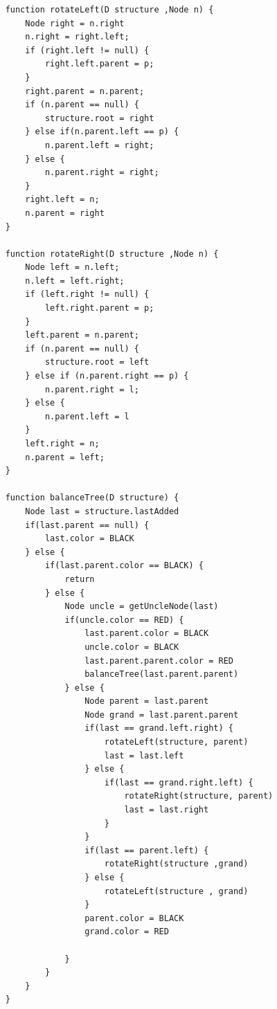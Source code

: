 \documentclass[11pt]{article}
\begin{document}
\begin{verbatim}
    function rotateLeft(D structure ,Node n) {
        Node right = n.right
        n.right = right.left;
        if (right.left != null) {
            right.left.parent = p;
        }
        right.parent = n.parent;
        if (n.parent == null) {
            structure.root = right
        } else if(n.parent.left == p) {
            n.parent.left = right;
        } else {
            n.parent.right = right;
        }
        right.left = n;
        n.parent = right  
    }

    function rotateRight(D structure ,Node n) {
        Node left = n.left;
        n.left = left.right;
        if (left.right != null) {
            left.right.parent = p;
        }
        left.parent = n.parent;
        if (n.parent == null) {
            structure.root = left
        } else if (n.parent.right == p) {
            n.parent.right = l;
        } else {
            n.parent.left = l
        } 
        left.right = n;
        n.parent = left;
    }

    function balanceTree(D structure) {
        Node last = structure.lastAdded
        if(last.parent == null) {
            last.color = BLACK
        } else {
            if(last.parent.color == BLACK) {
                return
            } else {
                Node uncle = getUncleNode(last)
                if(uncle.color == RED) {
                    last.parent.color = BLACK
                    uncle.color = BLACK
                    last.parent.parent.color = RED
                    balanceTree(last.parent.parent)
                } else {
                    Node parent = last.parent
                    Node grand = last.parent.parent
                    if(last == grand.left.right) {
                        rotateLeft(structure, parent)
                        last = last.left
                    } else {
                        if(last == grand.right.left) {
                            rotateRight(structure, parent)
                            last = last.right
                        }
                    }
                    if(last == parent.left) {
                        rotateRight(structure ,grand)
                    } else {
                        rotateLeft(structure , grand)
                    }
                    parent.color = BLACK
                    grand.color = RED

                }
            }
        }
    }


        \end{verbatim}
       
    
\end{document}
